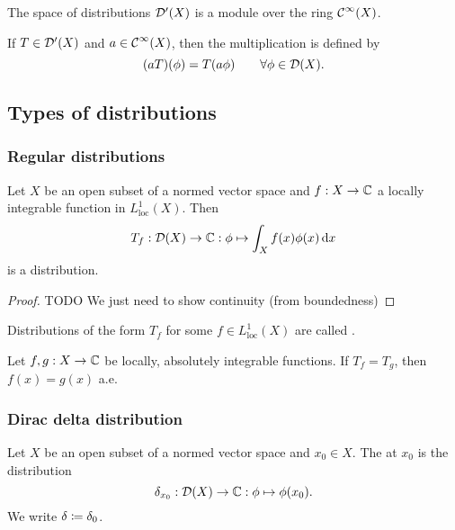 \begin{proposition}
    The space of distributions $\operatorname{\mathcal{D}^\prime}(X)$ is a module over the ring $\operatorname{\mathcal{C}}^\infty(X)$.
    
    If $T\in \operatorname{\mathcal{D}^\prime}(X)$ and $a\in \operatorname{\mathcal{C}}^\infty(X)$, then the multiplication is defined by
    \[ (aT)(\phi) = T(a\phi) \qquad \forall \phi \in \operatorname{\mathcal{D}}(X). \]
\end{proposition}

\subsection{Types of distributions}
\subsubsection{Regular distributions}
\begin{lemma}
Let $X$ be an open subset of a normed vector space and $f: X\to\mathbb{C}$ a locally integrable function in $L^1_\text{loc}(X)$. Then
\[ T_f: \operatorname{\mathcal{D}}(X) \to \mathbb{C}: \phi \mapsto \int_X f(x)\phi(x)\operatorname{d \!}{x} \]
is a distribution.
\end{lemma}
\begin{proof}
TODO We just need to show continuity (from boundedness)
\end{proof}

\begin{definition}
Distributions of the form $T_f$ for some $f\in L^1_\text{loc}(X)$ are called .
\end{definition}


\begin{lemma} \label{uniquenessIntegratedFunction}
Let $f,g: X\to \mathbb{C}$ be locally, absolutely integrable functions. If $T_f = T_g$, then $f(x) = g(x)$ a.e.
\end{lemma}

\subsubsection{Dirac delta distribution}
\begin{definition}
    Let $X$ be an open subset of a normed vector space and $x_0\in X$. The  at $x_0$ is the distribution
    \[ \delta_{x_0}: \operatorname{\mathcal{D}}(X) \to \mathbb{C}: \phi \mapsto \phi(x_0). \]
    We write $\delta \coloneqq \delta_0$.
\end{definition}

